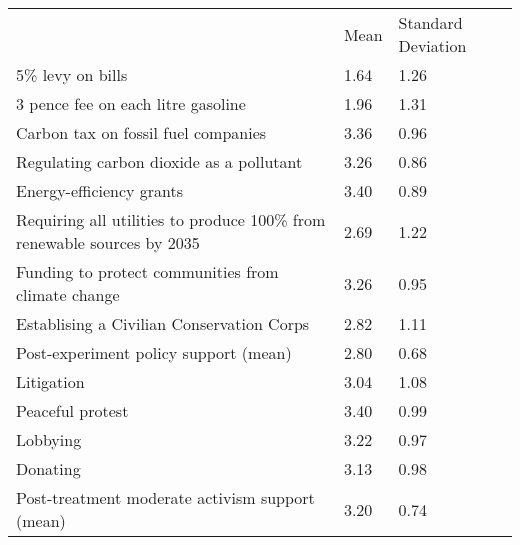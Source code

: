 \documentclass{article}
\begin{document}
\begin{table}[!h]
\centering
\begin{tabular}{lll}
\cline{1-3}
\multicolumn{1}{|l}{} &
  \multicolumn{1}{|l}{Mean} &
  \multicolumn{1}{|l|}{Standard Deviation} \\
\cline{1-3}
\multicolumn{1}{|l}{5\% levy on bills} &
  \multicolumn{1}{|l}{1.64} &
  \multicolumn{1}{|l|}{1.26} \\
\cline{1-3}
\multicolumn{1}{|l}{3 pence fee on each litre gasoline} &
  \multicolumn{1}{|l}{1.96} &
  \multicolumn{1}{|l|}{1.31} \\
\cline{1-3}
\multicolumn{1}{|l}{Carbon tax on fossil fuel companies} &
  \multicolumn{1}{|l}{3.36} &
  \multicolumn{1}{|l|}{0.96} \\
\cline{1-3}
\multicolumn{1}{|l}{Regulating carbon dioxide as a pollutant} &
  \multicolumn{1}{|l}{3.26} &
  \multicolumn{1}{|l|}{0.86} \\
\cline{1-3}
\multicolumn{1}{|l}{Energy-efficiency grants} &
  \multicolumn{1}{|l}{3.40} &
  \multicolumn{1}{|l|}{0.89} \\
\cline{1-3}
\multicolumn{1}{|l}{Requiring all utilities to produce 100\% from renewable sources by 2035} &
  \multicolumn{1}{|l}{2.69} &
  \multicolumn{1}{|l|}{1.22} \\
\cline{1-3}
\multicolumn{1}{|l}{Funding to protect communities from climate change} &
  \multicolumn{1}{|l}{3.26} &
  \multicolumn{1}{|l|}{0.95} \\
\cline{1-3}
\multicolumn{1}{|l}{Establising a Civilian Conservation Corps} &
  \multicolumn{1}{|l}{2.82} &
  \multicolumn{1}{|l|}{1.11} \\
\cline{1-3}
\multicolumn{1}{|l}{Post-experiment policy support (mean)} &
  \multicolumn{1}{|l}{2.80} &
  \multicolumn{1}{|l|}{0.68} \\
\cline{1-3}
\multicolumn{1}{|l}{Litigation} &
  \multicolumn{1}{|l}{3.04} &
  \multicolumn{1}{|l|}{1.08} \\
\cline{1-3}
\multicolumn{1}{|l}{Peaceful protest} &
  \multicolumn{1}{|l}{3.40} &
  \multicolumn{1}{|l|}{0.99} \\
\cline{1-3}
\multicolumn{1}{|l}{Lobbying} &
  \multicolumn{1}{|l}{3.22} &
  \multicolumn{1}{|l|}{0.97} \\
\cline{1-3}
\multicolumn{1}{|l}{Donating} &
  \multicolumn{1}{|l}{3.13} &
  \multicolumn{1}{|l|}{0.98} \\
\cline{1-3}
\multicolumn{1}{|l}{Post-treatment moderate activism support (mean)} &
  \multicolumn{1}{|l}{3.20} &
  \multicolumn{1}{|l|}{0.74} \\

\end{tabular}
\end{table}
\end{document}
